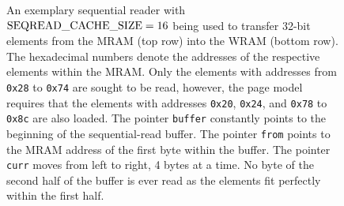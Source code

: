 \begin{figure}

	\caption{
		An exemplary sequential reader with \(\text{\lstinline|SEQREAD_CACHE_SIZE|} = 16\) being used to transfer 32-bit elements from the MRAM (top row) into the WRAM (bottom row).
		The hexadecimal numbers denote the addresses of the respective elements within the MRAM.
		Only the elements with addresses from \lstinline|0x28| to \lstinline|0x74| are sought to be read, however, the page model requires that the elements with addresses \lstinline|0x20|, \lstinline|0x24|, and \lstinline|0x78| to \lstinline|0x8c| are also loaded.
		The pointer \lstinline|buffer| constantly points to the beginning of the sequential-read buffer.
		The pointer \lstinline|from| points to the MRAM address of the first byte within the buffer.
		The pointer \lstinline|curr| moves from left to right, 4 bytes at a time.
		No byte of the second half of the buffer is ever read as the elements fit perfectly within the first half.
	}
	\label{fig:mram:reader}
\end{figure}

